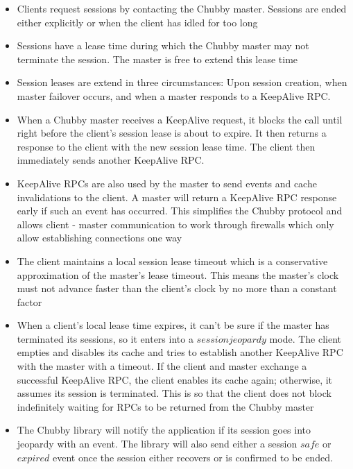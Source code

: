 \documentclass[a4paper]{article}
\begin{document}
\begin{itemize}
\begin{itemize}
\item Clients request sessions by contacting the Chubby master. Sessions are ended either explicitly or when the client has idled for too long

\item Sessions have a lease time during which the Chubby master may not terminate the session. The master is free to extend this lease time

\item Session leases are extend in three circumstances: Upon session creation, when master failover occurs, and when a master responds to a KeepAlive RPC.

\item When a Chubby master receives a KeepAlive request, it blocks the call until right before the client's session lease is about to expire. It then returns a response to the client with the new session lease time. The client then immediately sends another KeepAlive RPC. 

\item KeepAlive RPCs are also used by the master to send events and cache invalidations to the client. A master will return a KeepAlive RPC response early if such an event has occurred. This simplifies the Chubby protocol and allows client - master communication to work through firewalls which only allow establishing connections one way

\item The client maintains a local session lease timeout which is a conservative approximation of the master's lease timeout. This means the master's clock must not advance faster than the client's clock by no more than a constant factor

\item When a client's local lease time expires, it can't be sure if the master has terminated its sessions, so it enters into a $session jeopardy$ mode. The client empties and disables its cache and tries to establish another KeepAlive RPC with the master with a timeout. If the client and master exchange a successful KeepAlive RPC, the client enables its cache again; otherwise, it assumes its session is terminated. This is so that the client does not block indefinitely waiting for RPCs to be returned from the Chubby master

\item The Chubby library will notify the application if its session goes into jeopardy with an event. The library will also send either a session $safe$ or $expired$ event once the session either recovers or is confirmed to be ended.
\end{itemize}


\end{itemize}
\end{document}
